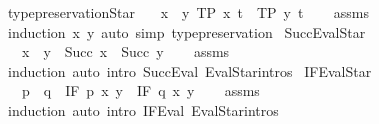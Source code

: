\begin{isabellebody}
\isanewline
{}\isamarkupfalse%
\ type{\isacharunderscore}{\kern0pt}preservation{\isacharunderscore}{\kern0pt}Star{\isacharcolon}{\kern0pt}\isanewline
\ \ \ {\isachardoublequoteopen}x\ {\isasymRrightarrow}{\isacharasterisk}{\kern0pt}\ y{\isachardoublequoteclose}\ {\isachardoublequoteopen}TP\ x\ t{\isachardoublequoteclose}\ \ {\isachardoublequoteopen}TP\ y\ t{\isachardoublequoteclose}\isanewline
%
\isadelimproof
\ \ %
\endisadelimproof
%
\isatagproof
{}\isamarkupfalse%
\ assms\ \isamarkupfalse%
\ {\isacharparenleft}{\kern0pt}induction\ x\ y{\isacharparenright}{\kern0pt}\ {\isacharparenleft}{\kern0pt}auto\ simp{\isacharcolon}{\kern0pt}\ type{\isacharunderscore}{\kern0pt}preservation{\isacharparenright}{\kern0pt}%
\endisatagproof
{\isafoldproof}%
%
\isadelimproof
\isanewline
%
\endisadelimproof
\isanewline
{}\isamarkupfalse%
\ Succ{\isacharunderscore}{\kern0pt}EvalStar{\isacharcolon}{\kern0pt}\isanewline
\ \ \ {\isachardoublequoteopen}x\ {\isasymRrightarrow}{\isacharasterisk}{\kern0pt}\ y{\isachardoublequoteclose}\ \ {\isachardoublequoteopen}Succ\ x\ {\isasymRrightarrow}{\isacharasterisk}{\kern0pt}\ Succ\ y{\isachardoublequoteclose}\isanewline
%
\isadelimproof
\ \ %
\endisadelimproof
%
\isatagproof
{}\isamarkupfalse%
\ assms\ \isamarkupfalse%
\ induction\ {\isacharparenleft}{\kern0pt}auto\ intro{\isacharcolon}{\kern0pt}\ Succ{\isacharunderscore}{\kern0pt}Eval\ EvalStar{\isachardot}{\kern0pt}intros{\isacharparenright}{\kern0pt}%
\endisatagproof
{\isafoldproof}%
%
\isadelimproof
\isanewline
%
\endisadelimproof
\isanewline
{}\isamarkupfalse%
\ IF{\isacharunderscore}{\kern0pt}EvalStar{\isacharcolon}{\kern0pt}\isanewline
\ \ \ {\isachardoublequoteopen}p\ {\isasymRrightarrow}{\isacharasterisk}{\kern0pt}\ q{\isachardoublequoteclose}\ \ {\isachardoublequoteopen}IF\ p\ x\ y\ {\isasymRrightarrow}{\isacharasterisk}{\kern0pt}\ IF\ q\ x\ y{\isachardoublequoteclose}\isanewline
%
\isadelimproof
\ \ %
\endisadelimproof
%
\isatagproof
{}\isamarkupfalse%
\ assms\ \isamarkupfalse%
\ induction\ {\isacharparenleft}{\kern0pt}auto\ intro{\isacharcolon}{\kern0pt}\ IF{\isacharunderscore}{\kern0pt}Eval\ EvalStar{\isachardot}{\kern0pt}intros{\isacharparenright}{\kern0pt}%
\endisatagproof
{\isafoldproof}%
%
\isadelimproof
\isanewline
%
\endisadelimproof
\isanewline
{}\isamarkupfalse%

\end{isabellebody}
